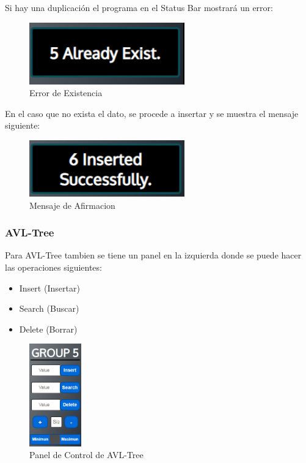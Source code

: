 \documentclass{article}
\begin{document}
    Si hay una duplicación el programa en el Status Bar mostrará un error:

        \begin{figure}[H]
        \centering
        \includegraphics[width=0.6\textwidth]{img/btree_alreadyexist.PNG}
        \caption{Error de Existencia}
        \end{figure}

En el caso que no exista el dato, se procede a insertar y se muestra el mensaje siguiente:

        \begin{figure}[H]
        \centering
        \includegraphics[width=0.6\textwidth]{img/btree_insertok.PNG}
        \caption{Mensaje de Afirmacion}
        \end{figure}

    \subsubsection{AVL-Tree}

    Para AVL-Tree tambien se tiene un panel en la izquierda donde se puede hacer las operaciones siguientes:
    \begin{itemize}
        \item Insert (Insertar)
        \item Search (Buscar)
        \item Delete (Borrar)
    \end{itemize}
    
        \begin{figure}[H]
        \centering
        \includegraphics[width=0.2\textwidth]{img/avl_cap1.PNG}
        \caption{Panel de Control de AVL-Tree}
        \end{figure}
\end{document}
